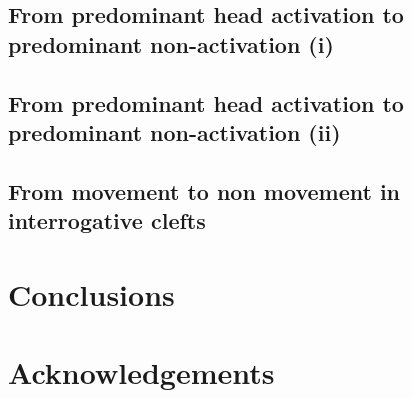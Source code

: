 \documentclass[fleqn,10pt]{wlscirep}
\begin{document}
\subsection*{From predominant head activation to predominant non-activation (i)}

\subsection*{From predominant head activation to predominant non-activation (ii)}

\subsection*{From movement to non movement in interrogative clefts}

\section*{Conclusions}




\section*{Acknowledgements}
\end{document}

